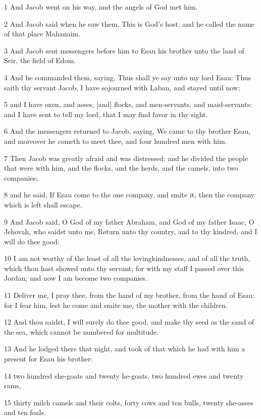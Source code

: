 \par 1 And Jacob went on his way, and the angels of God met him.
\par 2 And Jacob said when he saw them, This is God's host: and he called the name of that place Mahanaim.
\par 3 And Jacob sent messengers before him to Esau his brother unto the land of Seir, the field of Edom.
\par 4 And he commanded them, saying, Thus shall ye say unto my lord Esau: Thus saith thy servant Jacob, I have sojourned with Laban, and stayed until now:
\par 5 and I have oxen, and asses, [and] flocks, and men-servants, and maid-servants: and I have sent to tell my lord, that I may find favor in thy sight.
\par 6 And the messengers returned to Jacob, saying, We came to thy brother Esau, and moreover he cometh to meet thee, and four hundred men with him.
\par 7 Then Jacob was greatly afraid and was distressed: and he divided the people that were with him, and the flocks, and the herds, and the camels, into two companies;
\par 8 and he said, If Esau come to the one company, and smite it, then the company which is left shall escape.
\par 9 And Jacob said, O God of my father Abraham, and God of my father Isaac, O Jehovah, who saidst unto me, Return unto thy country, and to thy kindred, and I will do thee good:
\par 10 I am not worthy of the least of all the lovingkindnesses, and of all the truth, which thou hast showed unto thy servant; for with my staff I passed over this Jordan; and now I am become two companies.
\par 11 Deliver me, I pray thee, from the hand of my brother, from the hand of Esau: for I fear him, lest he come and smite me, the mother with the children.
\par 12 And thou saidst, I will surely do thee good, and make thy seed as the sand of the sea, which cannot be numbered for multitude.
\par 13 And he lodged there that night, and took of that which he had with him a present for Esau his brother:
\par 14 two hundred she-goats and twenty he-goats, two hundred ewes and twenty rams,
\par 15 thirty milch camels and their colts, forty cows and ten bulls, twenty she-asses and ten foals.
